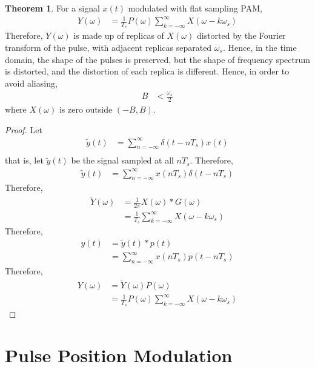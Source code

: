 \documentclass[titlepage, fleqn, a4paper, 12pt, twoside]{article}
\theoremstyle{definition}
\theoremstyle{theorem}
\newtheorem{theorem}{Theorem}
\renewcommand{\tilde}{\widetilde}
\begin{document}
\begin{theorem}
	For a signal $x(t)$ modulated with flat sampling PAM,
	\begin{align*}
		Y(\omega) &= \frac{1}{T_s} P(\omega) \sum\limits_{k = -\infty}^{\infty} X(\omega - k \omega_s)
	\end{align*}
	Therefore, $Y(\omega)$ is made up of replicas of $X(\omega)$ distorted by the Fourier transform of the pulse, with adjacent replicas separated $\omega_s$.
	Hence, in the time domain, the shape of the pulses is preserved, but the shape of frequency spectrum is distorted, and the distortion of each replica is different.
	Hence, in order to avoid aliasing,
	\begin{align*}
		B &< \frac{\omega_s}{2}
	\end{align*}
	where $X(\omega)$ is zero outside $(-B,B)$.
	\label{thm:Fourier_transform_of_signal_modulated_by_flat_sampling_PAM}
\end{theorem}

\begin{proof}
	Let
	\begin{align*}
		\tilde{y}(t) &= \sum\limits_{n = -\infty}^{\infty} \delta(t - n T_s) x(t)\\
	\end{align*}
	that is, let $\tilde{y}(t)$ be the signal sampled at all $n T_s$.
	Therefore,
	\begin{align*}
		\tilde{y}(t) &= \sum\limits_{n = -\infty}^{\infty} x(n T_s) \delta(t - n T_s)
	\end{align*}
	Therefore,
	\begin{align*}
		\tilde{Y}(\omega) &= \frac{1}{2 \pi} X(\omega) \ast G(\omega)\\
		&= \frac{1}{T_s} \sum\limits_{k = -\infty}^{\infty} X(\omega - k \omega_s)
	\end{align*}
	Therefore,
	\begin{align*}
		y(t) &= \tilde{y}(t) \ast p(t)\\
		&= \sum\limits_{n = -\infty}^{\infty} x(n T_s) p(t - n T_s)
	\end{align*}
	Therefore,
	\begin{align*}
		Y(\omega) &= \tilde{Y}(\omega) P(\omega)\\
		&= \frac{1}{T_s} P(\omega) \sum\limits_{k = -\infty}^{\infty} X(\omega - k \omega_s)
	\end{align*}
\end{proof}

\clearpage
\part{Pulse Position Modulation}
\end{document}
